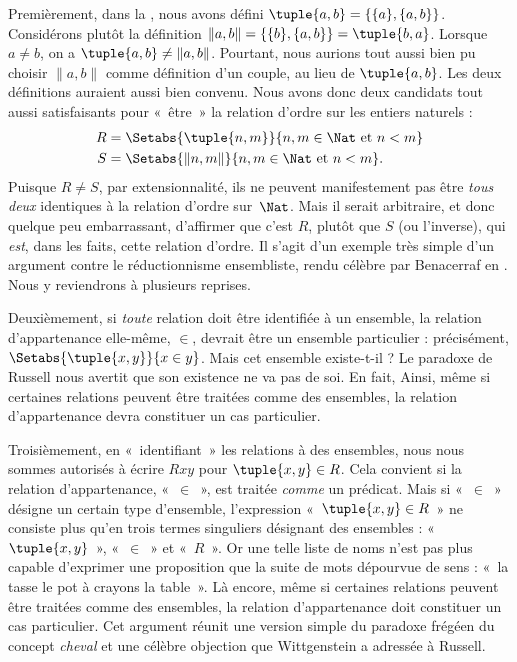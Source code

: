 \documentclass[11pt,a4paper,openany]{memoir}
\begin{document}
Premièrement, dans la ,
nous avons défini $\tuple{a, b} = \{\{a\}, \{a, b\}\}$.
Considérons plutôt la définition
$\lVert a, b\rVert = \{\{b\}, \{a, b\}\} = \tuple{b,a}$.
Lorsque $a \neq b$, on a
$\tuple{a, b} \neq \lVert a,b\rVert$.
Pourtant, nous aurions tout aussi bien pu choisir
$\lVert a,b\rVert$ comme définition d'un couple, au lieu de
$\tuple{a,b}$. Les deux définitions auraient aussi bien convenu.
Nous avons donc deux candidats tout aussi satisfaisants
pour «~être~» la relation d'ordre sur les entiers naturels :
\begin{align*}
		R &= \Setabs{\tuple{n,m}}{n, m \in \Nat \text{ et }n < m}\\
		S &= \Setabs{\lVert n,m\rVert}{n, m \in \Nat \text{ et }n < m}.
\end{align*}
Puisque $R \neq S$, par extensionnalité, ils ne peuvent
manifestement pas être \emph{tous deux} identiques à la relation
d'ordre sur~$\Nat$. Mais il serait arbitraire, et donc quelque
peu embarrassant, d'affirmer que c'est $R$, plutôt que $S$
(ou l'inverse), qui \emph{est}, dans les faits, cette relation
d'ordre. Il s'agit d'un exemple très simple d'un argument
contre le réductionnisme ensembliste, rendu célèbre par
Benacerraf en \citeyear{Benacerraf1965}.
Nous y reviendrons à plusieurs reprises.

Deuxièmement, si \emph{toute} relation doit être identifiée
à un ensemble, la relation d'appartenance elle-même, $\in$,
devrait être un ensemble particulier : précisément,
$\Setabs{\tuple{x,y}}{x \in y}$.
Mais cet ensemble existe-t-il ?
Le paradoxe de Russell nous avertit que son existence
ne va pas de soi. En fait,
Ainsi, même si certaines relations peuvent être traitées
comme des ensembles, la relation d'appartenance devra
constituer un cas particulier.

Troisièmement, en «~identifiant~» les relations à des ensembles,
nous nous sommes autorisés à écrire $Rxy$ pour
$\tuple{x,y} \in R$. Cela convient si la relation
d'appartenance, «~$\in$~», est traitée \emph{comme} un prédicat.
Mais si «~$\in$~» désigne un certain type d'ensemble,
l'expression «~$\tuple{x,y} \in R$~» ne consiste plus
qu'en trois termes singuliers désignant des ensembles :
«~$\tuple{x,y}$~», «~$\in$~» et «~$R$~».
Or une telle liste de noms n'est pas plus capable d'exprimer
une proposition que la suite de mots dépourvue de sens :
«~la tasse le pot à crayons la table~».
Là encore, même si certaines relations peuvent être traitées
comme des ensembles, la relation d'appartenance doit constituer
un cas particulier. Cet argument réunit une version simple
du paradoxe frégéen du concept \emph{cheval} et une célèbre
objection que Wittgenstein a adressée à Russell.
\end{document}
